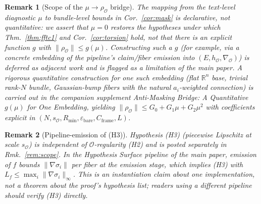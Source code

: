 \documentclass[11pt]{article}
\newtheorem{remark}{Remark}
\newcommand{\sO}{s_{\mathcal{O}}}  %
\newcommand{\Obs}{\mathcal{O}}
\newcommand{\resO}{\rho_{\Obs}}
\newcommand{\nablaO}{\nabla_{\Obs}}
\newcommand{\hO}{h_{\Obs}}
\newcommand{\mask}{\mu}
\newcommand{\EE}{E}
\begin{document}
\begin{remark}[Scope of the $\mask \to \resO$ bridge]
\label{rem:mask-bridge}
The mapping from the text-level diagnostic $\mask$ to bundle-level
bounds in Cor.~\ref{cor:mask} is \emph{declarative}, not
quantitative: we assert that $\mask = 0$ restores the hypotheses
under which Thm.~\ref{thm:fftc1} and Cor.~\ref{cor:torsion} hold, not
that there is an explicit function $g$ with
$\|\resO\| \leq g(\mask)$. Constructing such a $g$ (for example,
via a concrete embedding of the pipeline's claim/fiber emission
into $(\EE, \hO, \nablaO)$) is deferred as adjacent work and is
flagged as a limitation of the main paper. A rigorous quantitative
construction for one such embedding (flat $\mathbb{R}^n$ base, trivial
rank-$N$ bundle, Gaussian-bump fibers with the natural
$a_i$-weighted connection) is carried out in the companion
supplement \emph{Anti-Masking Bridge: A Quantitative $g(\mask)$ for
One Embedding}, yielding
$\|\resO\| \leq G_0 + G_1 \mask + G_2 \mask^2$ with coefficients
explicit in $(N, s_\Obs, R_{\min}, \varepsilon_{\mathrm{bare}},
C_{\mathrm{frame}}, L)$.
\end{remark}

\begin{remark}[Pipeline-emission of (H3)]
\label{rem:pipelineH3}
Hypothesis (H3) (piecewise Lipschitz at scale $\sO$) is independent
of $\Obs$-regularity (H2) and is posted separately in
Rmk.~\ref{rem:scope}. In the Hypothesis Surface pipeline of the main
paper, emission of $f$ bounds $\|\nabla \sigma_i\|$ per fiber at the
emission stage, which implies (H3) with
$L_f \leq \max_i \|\nabla \sigma_i\|_\infty$. This is an instantiation
claim about one implementation, not a theorem about the proof's
hypothesis list; readers using a different pipeline should verify
(H3) directly.
\end{remark}
\end{document}
